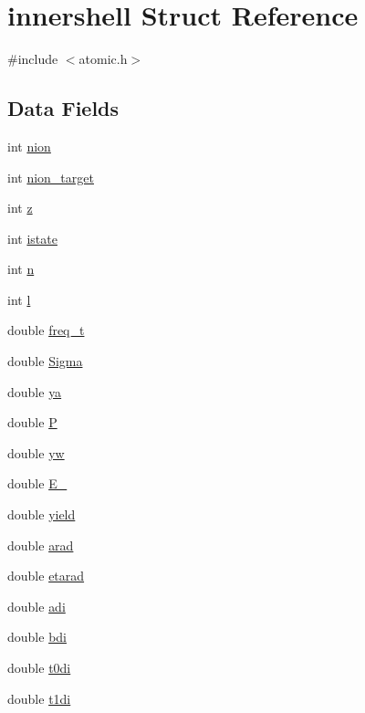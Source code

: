 \hypertarget{structinnershell}{}\section{innershell Struct Reference}
\label{structinnershell}


{\ttfamily \#include $<$atomic.\+h$>$}

\subsection*{Data Fields}
\begin{DoxyCompactItemize}
\item 
int \hyperlink{structinnershell_a9370572876071e35ac4fda3f7df21db8}{nion}
\item 
int \hyperlink{structinnershell_a2e3b6defa68f40ea8c3c38b68cb0c8cb}{nion\+\_\+target}
\item 
int \hyperlink{structinnershell_ab683790cd59d9da8c2c8e2d1dcb2a970}{z}
\item 
int \hyperlink{structinnershell_a13aff941c3a029b012f90e0a377c939c}{istate}
\item 
int \hyperlink{structinnershell_a2ea1f581a77ccb06023b035e150b602d}{n}
\item 
int \hyperlink{structinnershell_a17cd64eb9054ee44728107617f5e928c}{l}
\item 
double \hyperlink{structinnershell_ae824e960b3de652b9906b282f4ea2400}{freq\+\_\+t}
\item 
double \hyperlink{structinnershell_a2383238b23b454ec2ea9e020e3e1953c}{Sigma}
\item 
double \hyperlink{structinnershell_a0c982a600d5d6718ac24af993e4a92c1}{ya}
\item 
double \hyperlink{structinnershell_aa735df41855456a9a6b77908498e02e3}{P}
\item 
double \hyperlink{structinnershell_a7e0080ec032ea977538a4b0c0d0ec86f}{yw}
\item 
double \hyperlink{structinnershell_a3fbae0913c0bfeebe3061f5973959b5e}{E\+\_}
\item 
double \hyperlink{structinnershell_a1c9a25bdebb548e8296186d395d46189}{yield}
\item 
double \hyperlink{structinnershell_a1a23a3a1072fe0728beeb00e6cb6af53}{arad}
\item 
double \hyperlink{structinnershell_aabedc3071b0ed17c9155d4ad7709eae5}{etarad}
\item 
double \hyperlink{structinnershell_a0fb51c1d8fc61cc8d13f06f7b4a7a5c9}{adi}
\item 
double \hyperlink{structinnershell_a7242c2f0a726557fc183513409719403}{bdi}
\item 
double \hyperlink{structinnershell_a6fe68b83024856ade7819bffe0edb3cd}{t0di}
\item 
double \hyperlink{structinnershell_a3da0028ce140404740e561671bc889cb}{t1di}
\end{DoxyCompactItemize}



